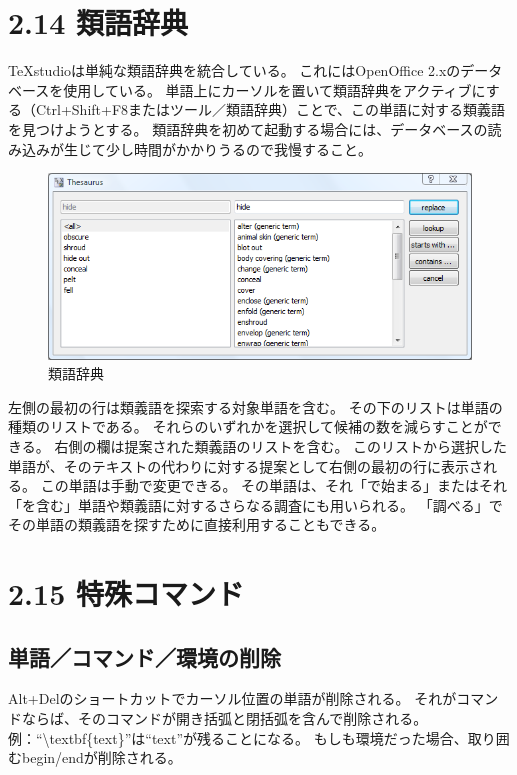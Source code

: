 \documentclass[]{book}
\makeatletter
\def\maxwidth{\ifdim\Gin@nat@width>\linewidth\linewidth
\else\Gin@nat@width\fi}
\let\Oldincludegraphics\includegraphics
\renewcommand{\includegraphics}[1]{\Oldincludegraphics[width=\maxwidth]{#1}}
\makeatother
\begin{document}
\section{2.14 類語辞典}

TeXstudioは単純な類語辞典を統合している。 これにはOpenOffice
2.xのデータベースを使用している。
単語上にカーソルを置いて類語辞典をアクティブにする（Ctrl+Shift+F8またはツール／類語辞典）ことで、この単語に対する類義語を見つけようとする。
類語辞典を初めて起動する場合には、データベースの読み込みが生じて少し時間がかかりうるので我慢すること。

\begin{figure}[htbp]
\centering
\includegraphics{thesaurus.png}
\caption{類語辞典}
\end{figure}

左側の最初の行は類義語を探索する対象単語を含む。
その下のリストは単語の種類のリストである。
それらのいずれかを選択して候補の数を減らすことができる。
右側の欄は提案された類義語のリストを含む。
このリストから選択した単語が、そのテキストの代わりに対する提案として右側の最初の行に表示される。
この単語は手動で変更できる。
その単語は、それ「で始まる」またはそれ「を含む」単語や類義語に対するさらなる調査にも用いられる。
「調べる」でその単語の類義語を探すために直接利用することもできる。

\section{2.15 特殊コマンド}

\subsection{単語／コマンド／環境の削除}

Alt+Delのショートカットでカーソル位置の単語が削除される。
それがコマンドならば、そのコマンドが開き括弧と閉括弧を含んで削除される。
例：``\textbackslash{}textbf\{text\}''は``text''が残ることになる。
もしも環境だった場合、取り囲むbegin/endが削除される。
\end{document}
